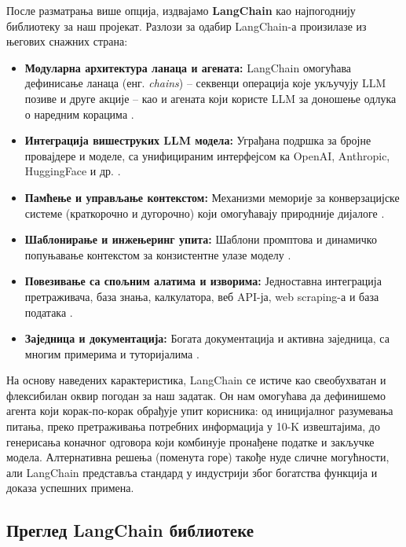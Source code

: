После разматрања више опција, издвајамо \textbf{LangChain} као најпогоднију библиотеку за наш пројекат. Разлози за одабир LangChain-а произилазе из његових снажних страна:
\begin{itemize}
    \item \textbf{Модуларна архитектура ланаца и агената:} LangChain омогућава дефинисање ланаца (енг. \textit{chains}) -- секвенци операција које укључују LLM позиве и друге акције -- као и агената који користе LLM за доношење одлука о наредним корацима \cite{patriwala_langchain_2025}.
    \item \textbf{Интеграција вишеструких LLM модела:} Уграђана подршка за бројне провајдере и моделе, са унифицираним интерфејсом ка OpenAI, Anthropic, HuggingFace и др. \cite{ibm_what_is_langchain_2023,patriwala_langchain_2025}.
    \item \textbf{Памћење и управљање контекстом:} Механизми меморије за конверзацијске системе (краткорочно и дугорочно) који омогућавају природније дијалоге \cite{patriwala_langchain_2025}.
    \item \textbf{Шаблонирање и инжењеринг упита:} Шаблони промптова и динамичко попуњавање контекстом за конзистентне улазе моделу \cite{patriwala_langchain_2025}.
    \item \textbf{Повезивање са спољним алатима и изворима:} Једноставна интеграција претраживача, база знања, калкулатора, веб API-ја, web scraping-а и база података \cite{ibm_what_is_langchain_2023,patriwala_langchain_2025}.
    \item \textbf{Заједница и документација:} Богата документација и активна заједница, са многим примерима и туторијалима \cite{ibm_what_is_langchain_2023,patriwala_langchain_2025}.
\end{itemize}

На основу наведених карактеристика, LangChain се истиче као свеобухватан и флексибилан оквир погодан за наш задатак. Он нам омогућава да дефинишемо агента који корак-по-корак обрађује упит корисника: од иницијалног разумевања питања, преко претраживања потребних информација у 10-K извештајима, до генерисања коначног одговора који комбинује пронађене податке и закључке модела. Алтернативна решења (поменута горе) такође нуде сличне могућности, али LangChain представља стандард у индустрији због богатства функција и доказа успешних примена.

\subsection{Преглед LangChain библиотеке}

